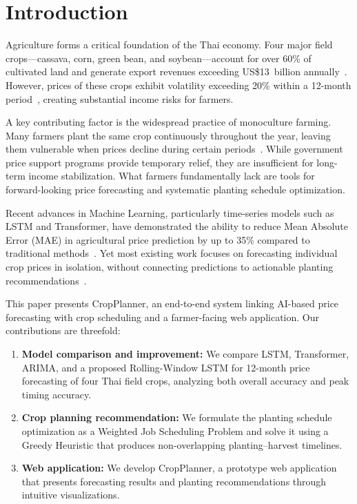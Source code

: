 \documentclass[conference]{IEEEtran}
\begin{document}
\section{Introduction}

Agriculture forms a critical foundation of the Thai economy. Four major field crops---cassava, corn, green bean, and soybean---account for over 60\% of cultivated land and generate export revenues exceeding US\$13~billion annually~\cite{oae2024stats, oae2024forecast, ocsb2024, thairice2024}. However, prices of these crops exhibit volatility exceeding 20\% within a 12-month period~\cite{waqas2024climate}, creating substantial income risks for farmers.

A key contributing factor is the widespread practice of monoculture farming. Many farmers plant the same crop continuously throughout the year, leaving them vulnerable when prices decline during certain periods~\cite{asg2014}. While government price support programs provide temporary relief, they are insufficient for long-term income stabilization. What farmers fundamentally lack are tools for forward-looking price forecasting and systematic planting schedule optimization.

Recent advances in Machine Learning, particularly time-series models such as LSTM and Transformer, have demonstrated the ability to reduce Mean Absolute Error (MAE) in agricultural price prediction by up to 35\% compared to traditional methods~\cite{rohan2025crop}. Yet most existing work focuses on forecasting individual crop prices in isolation, without connecting predictions to actionable planting recommendations~\cite{javaid2023ai}.

This paper presents CropPlanner, an end-to-end system linking AI-based price forecasting with crop scheduling and a farmer-facing web application. Our contributions are threefold:

\begin{enumerate}
  \item \textbf{Model comparison and improvement:} We compare LSTM, Transformer, ARIMA, and a proposed Rolling-Window LSTM for 12-month price forecasting of four Thai field crops, analyzing both overall accuracy and peak timing accuracy.
  \item \textbf{Crop planning recommendation:} We formulate the planting schedule optimization as a Weighted Job Scheduling Problem and solve it using a Greedy Heuristic that produces non-overlapping planting--harvest timelines.
  \item \textbf{Web application:} We develop CropPlanner, a prototype web application that presents forecasting results and planting recommendations through intuitive visualizations.
\end{enumerate}
\end{document}
